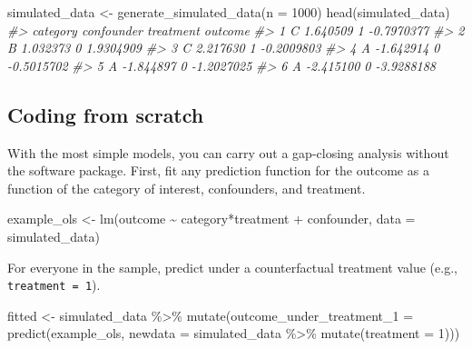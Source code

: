 \documentclass[
]{article}
\newenvironment{Shaded}{\begin{snugshade}}{\end{snugshade}}
\newcommand{\AttributeTok}[1]{\textcolor[rgb]{0.77,0.63,0.00}{#1}}
\newcommand{\CommentTok}[1]{\textcolor[rgb]{0.56,0.35,0.01}{\textit{#1}}}
\newcommand{\DecValTok}[1]{\textcolor[rgb]{0.00,0.00,0.81}{#1}}
\newcommand{\FunctionTok}[1]{\textcolor[rgb]{0.00,0.00,0.00}{#1}}
\newcommand{\NormalTok}[1]{#1}
\newcommand{\OtherTok}[1]{\textcolor[rgb]{0.56,0.35,0.01}{#1}}
\newcommand{\SpecialCharTok}[1]{\textcolor[rgb]{0.00,0.00,0.00}{#1}}
\begin{document}
\begin{Shaded}
\begin{Highlighting}[]
\NormalTok{simulated\_data }\OtherTok{\textless{}{-}} \FunctionTok{generate\_simulated\_data}\NormalTok{(}\AttributeTok{n =} \DecValTok{1000}\NormalTok{)}
\FunctionTok{head}\NormalTok{(simulated\_data)}
\CommentTok{\#\textgreater{}   category confounder treatment    outcome}
\CommentTok{\#\textgreater{} 1        C   1.640509         1 {-}0.7970377}
\CommentTok{\#\textgreater{} 2        B   1.032373         0  1.9304909}
\CommentTok{\#\textgreater{} 3        C   2.217630         1 {-}0.2009803}
\CommentTok{\#\textgreater{} 4        A  {-}1.642914         0 {-}0.5015702}
\CommentTok{\#\textgreater{} 5        A  {-}1.844897         0 {-}1.2027025}
\CommentTok{\#\textgreater{} 6        A  {-}2.415100         0 {-}3.9288188}
\end{Highlighting}
\end{Shaded}

\hypertarget{coding-from-scratch}{%
\subsection{Coding from scratch}\label{coding-from-scratch}}

With the most simple models, you can carry out a gap-closing analysis without the software package. First, fit any prediction function for the outcome as a function of the category of interest, confounders, and treatment.

\begin{Shaded}
\begin{Highlighting}[]
\NormalTok{example\_ols }\OtherTok{\textless{}{-}} \FunctionTok{lm}\NormalTok{(outcome }\SpecialCharTok{\textasciitilde{}}\NormalTok{ category}\SpecialCharTok{*}\NormalTok{treatment }\SpecialCharTok{+}\NormalTok{ confounder,}
                  \AttributeTok{data =}\NormalTok{ simulated\_data)}
\end{Highlighting}
\end{Shaded}

For everyone in the sample, predict under a counterfactual treatment value (e.g., \texttt{treatment\ =\ 1}).

\begin{Shaded}
\begin{Highlighting}[]
\NormalTok{fitted }\OtherTok{\textless{}{-}}\NormalTok{ simulated\_data }\SpecialCharTok{\%\textgreater{}\%}
  \FunctionTok{mutate}\NormalTok{(}\AttributeTok{outcome\_under\_treatment\_1 =} \FunctionTok{predict}\NormalTok{(example\_ols,}
                                             \AttributeTok{newdata =}\NormalTok{ simulated\_data }\SpecialCharTok{\%\textgreater{}\%}
                                               \FunctionTok{mutate}\NormalTok{(}\AttributeTok{treatment =} \DecValTok{1}\NormalTok{)))}
\end{Highlighting}
\end{Shaded}
\end{document}
